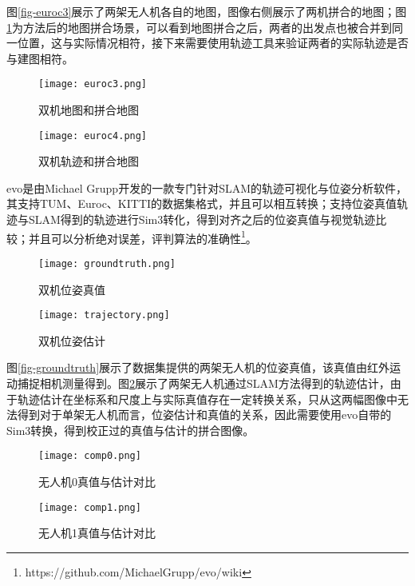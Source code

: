 图\ref{fig-euroc3}展示了两架无人机各自的地图，图像右侧展示了两机拼合的地图；图\ref{fig-euroc4}为方法后的地图拼合场景，可以看到地图拼合之后，两者的出发点也被合并到同一位置，这与实际情况相符，接下来需要使用轨迹工具来验证两者的实际轨迹是否与建图相符。
~\\
\begin{figure}[htbp]
	\centering
	\begin{minipage}[t]{0.45\columnwidth} %
		\centering
		\texttt{[image: euroc3.png]}
		\caption{双机地图和拼合地图}
		\label{fig-euroc3}
	\end{minipage}
	\begin{minipage}[t]{0.45\columnwidth}
		\centering
		\texttt{[image: euroc4.png]}
		\caption{双机轨迹和拼合地图}
		\label{fig-euroc4}
	\end{minipage}
\end{figure}

evo是由Michael Grupp开发的一款专门针对SLAM的轨迹可视化与位姿分析软件，其支持TUM、Euroc、KITTI的数据集格式，并且可以相互转换；支持位姿真值轨迹与SLAM得到的轨迹进行Sim3转化，得到对齐之后的位姿真值与视觉轨迹比较；并且可以分析绝对误差，评判算法的准确性\footnote[1]{https://github.com/MichaelGrupp/evo/wiki}。
~\\
\begin{figure}[htbp]
	\centering
	\begin{minipage}[t]{0.45\columnwidth} %
		\centering
		\texttt{[image: groundtruth.png]}
		\caption{双机位姿真值}
		\label{fig-groundtruth}
	\end{minipage}
	\begin{minipage}[t]{0.45\columnwidth}
		\centering
		\texttt{[image: trajectory.png]}
		\caption{双机位姿估计}
		\label{fig-trajectory}
	\end{minipage}
\end{figure}

图\ref{fig-groundtruth}展示了数据集提供的两架无人机的位姿真值，该真值由红外运动捕捉相机测量得到。图\ref{fig-trajectory}展示了两架无人机通过SLAM方法得到的轨迹估计，由于轨迹估计在坐标系和尺度上与实际真值存在一定转换关系，只从这两幅图像中无法得到对于单架无人机而言，位姿估计和真值的关系，因此需要使用evo自带的Sim3转换，得到校正过的真值与估计的拼合图像。
~\\
\begin{figure}[htbp]
	\centering
	\begin{minipage}[t]{0.45\columnwidth} %
		\centering
		\texttt{[image: comp0.png]}
		\caption{无人机0真值与估计对比}
		\label{fig-comp0}
	\end{minipage}
	\begin{minipage}[t]{0.45\columnwidth}
		\centering
		\texttt{[image: comp1.png]}
		\caption{无人机1真值与估计对比}
		\label{fig-comp1}
	\end{minipage}
\end{figure}

